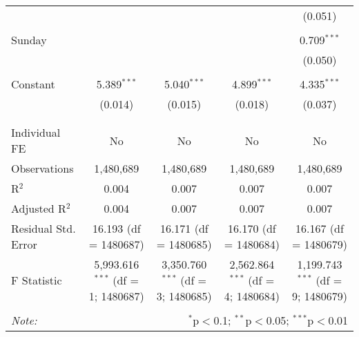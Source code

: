\documentclass[
]{article}
\begin{document}
\begin{table}[!htbp]
{\begin{tabular}{@{\extracolsep{5pt}}lcccc}
  &  &  &  & (0.051) \\ 
  & & & & \\ 
 Sunday &  &  &  & 0.709$^{***}$ \\ 
  &  &  &  & (0.050) \\ 
  & & & & \\ 
 Constant & 5.389$^{***}$ & 5.040$^{***}$ & 4.899$^{***}$ & 4.335$^{***}$ \\ 
  & (0.014) & (0.015) & (0.018) & (0.037) \\ 
  & & & & \\ 
\hline \\[-1.8ex] 
Individual FE & No & No & No & No \\ 
Observations & 1,480,689 & 1,480,689 & 1,480,689 & 1,480,689 \\ 
R$^{2}$ & 0.004 & 0.007 & 0.007 & 0.007 \\ 
Adjusted R$^{2}$ & 0.004 & 0.007 & 0.007 & 0.007 \\ 
Residual Std. Error & 16.193 (df = 1480687) & 16.171 (df = 1480685) & 16.170 (df = 1480684) & 16.167 (df = 1480679) \\ 
F Statistic & 5,993.616$^{***}$ (df = 1; 1480687) & 3,350.760$^{***}$ (df = 3; 1480685) & 2,562.864$^{***}$ (df = 4; 1480684) & 1,199.743$^{***}$ (df = 9; 1480679) \\ 
\hline 
\hline \\[-1.8ex] 
\textit{Note:}  & \multicolumn{4}{r}{$^{*}$p$<$0.1; $^{**}$p$<$0.05; $^{***}$p$<$0.01} \\ 
\end{tabular}
} 
\end{table} 
\newpage
\end{document}
